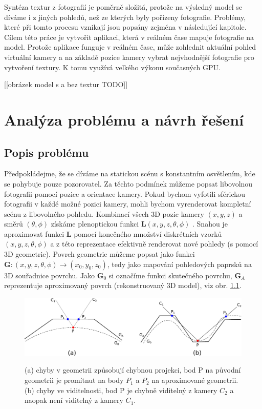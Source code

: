 \documentclass[11pt,twoside,a4paper]{book}
\begin{document}
Syntéza textur z fotografií je poměrně složitá, protože 	na výsledný model se díváme i z jiných pohledů, než ze kterých byly pořízeny fotografie. Problémy, které při tomto procesu vznikají jsou popsány zejména v následující kapitole. Cílem této práce je vytvořit aplikaci, která v reálném čase mapuje fotografie na model. Protože aplikace funguje v reálném čase, může zohlednit aktuální pohled virtuální kamery a na základě pozice kamery vybrat nejvhodnější fotografie pro vytvoření textury. K tomu využívá velkého výkonu současných GPU.

[[obrázek model s a bez textur TODO]]


\chapter{Analýza problému a návrh řešení} %

\section{Popis problému}

Předpokládejme, že se díváme na statickou scénu s konstantním osvětlením, kde se pohybuje pouze pozorovatel. Za těchto podmínek můžeme popsat libovolnou fotografii pomocí pozice a orientace kamery. Pokud bychom vyfotili sférickou fotografii v každé možné pozici kamery, mohli bychom vyrenderovat kompletní scénu z libovolného pohledu. Kombinací všech 3D pozic kamery $(x, y, z)$ a směrů $(\theta, \phi)$ získáme plenoptickou funkci $\textbf{L}(x, y, z, \theta, \phi)$ \cite{Adelson91}. Snahou je aproximovat funkci \textbf{L} pomocí konečného množství diskrétních vzorků $(x, y, z, \theta, \phi)$ a z této reprezentace efektivně renderovat nové pohledy (s pomocí 3D geometrie). Povrch geometrie můžeme popsat jako funkci $\textbf{G} : (x, y, z, \theta, \phi) \to (x_0, y_0, z_0)$, tedy jako mapování pohledových paprsků na 3D souřadnice povrchu. Jako $\textbf{G}_0$ si označíme funkci skutečného povrchu, $\textbf{G}_A$  reprezentuje aproximovaný povrch (rekonstruovaný 3D model), viz obr. \ref{fig:projection-error}.

\begin{figure}[hb]
\begin{center}
\includegraphics[width=\textwidth]{figures/projection-error}
\label{fig:projection-error}
\caption{(a) chyby v geometrii způsobují chybnou projekci, bod P na původní geometrii je promítnut na body $P_1$ a $P_2$ na aproximované geometrii. (b) chyby ve viditelnosti, bod P je chybně viditelný z kamery $C_2$ a naopak není viditelný z kamery $C_1$.}
\end{center}
\end{figure}
\end{document}

